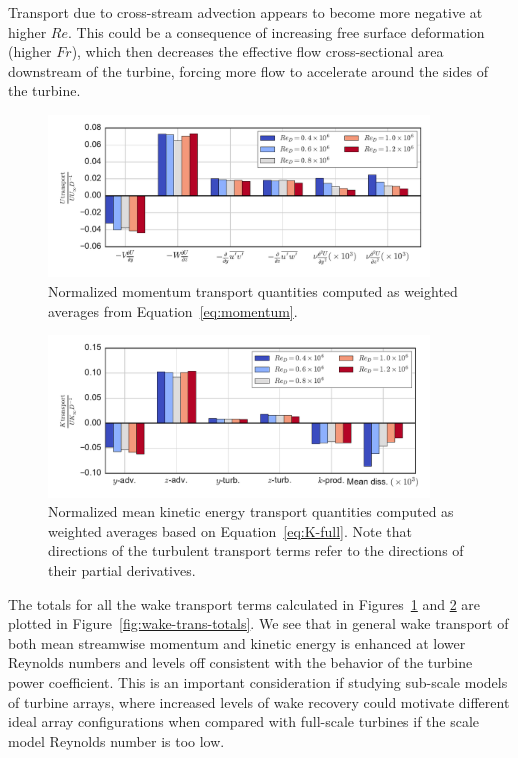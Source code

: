 \documentclass[energies,article,accept,moreauthors,pdftex,12pt,a4paper]{mdpi}
\begin{document}
Transport due to cross-stream advection appears to become more negative at
higher $Re$. This could be a consequence of increasing free surface deformation
(higher $Fr$), which then decreases the effective flow cross-sectional area
downstream of the turbine, forcing more flow to accelerate around the sides of
the turbine.

\begin{figure}[ht!]
    \centering
    
    \includegraphics[width=0.9\textwidth]{figures/mom_bar_graph}
    
    \caption{Normalized momentum transport quantities computed as weighted
        averages from Equation~\ref{eq:momentum}.}
    
    \label{fig:mom-bar-graph}
\end{figure}

\begin{figure}[ht!]
    \centering
    
    \includegraphics[width=0.9\textwidth]{figures/K_trans_bar_graph}
    
    \caption{Normalized mean kinetic energy transport quantities computed as
        weighted averages based on Equation~\ref{eq:K-full}. Note that directions of
        the turbulent transport terms refer to the directions of their partial
        derivatives.}
    
    \label{fig:K-bar-graph}
\end{figure}

The totals for all the wake transport terms calculated in
Figures~\ref{fig:mom-bar-graph} and \ref{fig:K-bar-graph} are plotted in
Figure~\ref{fig:wake-trans-totals}. We see that in general wake transport of
both mean streamwise momentum and kinetic energy is enhanced at lower Reynolds
numbers and levels off consistent with the behavior of the turbine power
coefficient. This is an important consideration if studying sub-scale models of
turbine arrays, where increased levels of wake recovery could motivate different
ideal array configurations when compared with full-scale turbines if the scale
model Reynolds number is too low.
\end{document}

